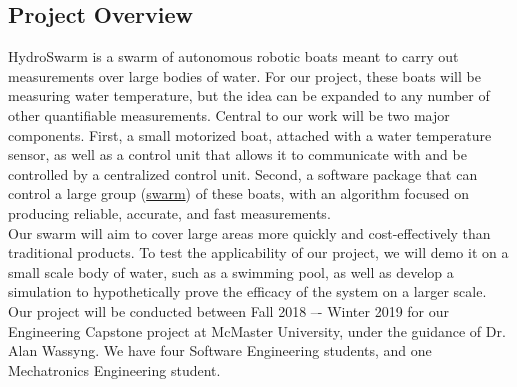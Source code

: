 \documentclass[11pt]{article}
\begin{document}
\subsection{Project Overview}
HydroSwarm is a swarm of autonomous robotic boats meant to carry out measurements over large bodies of water. For our project, these boats will be measuring water temperature, but the idea can be expanded to any number of other quantifiable measurements. Central to our work will be two major components. First, a small motorized boat, attached with a water temperature sensor, as well as a control unit that allows it to communicate with and be controlled by a centralized control unit. Second, a software package that can control a large group (\hyperref[sec:definitions]{swarm}) of these boats, with an algorithm focused on producing reliable, accurate, and fast measurements.\\

Our swarm will aim to cover large areas more quickly and cost-effectively than traditional products. To test the applicability of our project, we will demo it on a small scale body of water, such as a swimming pool, as well as develop a simulation to hypothetically prove the efficacy of the system on a larger scale.\\

Our project will be conducted between Fall 2018 –- Winter 2019 for our Engineering Capstone project at McMaster University, under the guidance of Dr. Alan Wassyng. We have four Software Engineering students, and one Mechatronics Engineering student. \\ \\
\end{document}
